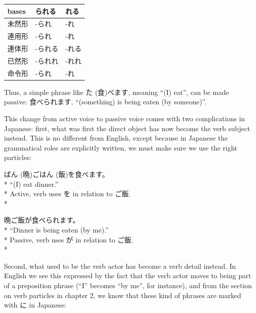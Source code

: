 \documentclass[11pt, b5paper, twoside, openright, onecolumn]{book}
\makeatletter
\newcommand*{\rubystack}[2]{{\relscale{0.5}%
  \begin{tabular}[b]{@{}c@{}}%
    {#1}\\%
   {\textscale{2}{#2}}%
  \end{tabular}}%
}
\DeclareRobustCommand*{\ruby}[2]{%
  \mbox{%
    \setlength{\parskip}{0ex}%
    \BeginAccSupp{method=pdfstringdef,ActualText={#1}}%
      \rubystack{\phantom{#2}}{#1}%
      \llap{%
        \rubystack{#2}{\phantom{#1}}%
      }%
    \EndAccSupp{}%
  }%
}
\renewcommand*{\ruby}[2]{#2 (#1)}%
\newenvironment{exampleblock}{
\setlength{\parindent}{0.6in}
\begin{minipage}[t]{\dimexpr\textwidth-\parindent}}
{\end{minipage}}
\newenvironment{mytabular}[1]{\noindent\hspace{0.4in}
\begin{tabular}[h]{#1}}{\end{tabular}}
\makeatother
\begin{document}
\vspace{0.5cm}
\smaller
\begin{mytabular}{| l  l  l |}\hline 
\rule{0pt}{2.4ex}bases & られる & れる\\ 
\hline
\rule{0pt}{2.4ex}未然形 & -られ & -れ\\ 
\rule{0pt}{2.4ex}連用形 & -られ & -れ\\ 
\rule{0pt}{2.4ex}連体形 & -られる & -れる\\ 
\rule{0pt}{2.4ex}已然形 & -られれ & -れれ\\ 
\rule{0pt}{2.4ex}命令形 & -られ & -れ\\ 
\hline 
\end{mytabular}
\larger
\vspace{0.5cm}


Thus‚ a simple phrase like \ruby{食}{た}べます‚ meaning “(I) eat”‚ can be made passive: 食べられます‚ “(something) is being eaten (by someone)”.

This change from active voice to passive voice comes with two complications in Japanese: first‚ what was first the direct object has now become the verb subject instead. This is no different from English‚ except because in Japanese the grammatical roles are explicitly written‚ we must make sure we use the right particles:

\vspace{0.4cm}
\begin{exampleblock}
\ruby{晩}{ばん}ご\ruby{飯}{はん}を食べます。 \\* 
“(I) eat dinner.” \\* 
Active‚ verb uses を in relation to ご飯. \\* 
\end{exampleblock}
\vspace{0.2cm}

\begin{exampleblock}
晩ご飯が食べられます。 \\* 
“Dinner is being eaten (by me).” \\* 
Passive‚ verb uses が in relation to ご飯. \\* 
\end{exampleblock}
\vspace{0.2cm}

Second‚ what used to be the verb actor has become a verb detail instead. In English we see this expressed by the fact that the verb actor moves to being part of a preposition phrase (“I” becomes “by me”‚ for instance)‚ and from the section on verb particles in chapter 2‚ we know that these kind of phrases are marked with に in Japanese:
\end{document}
